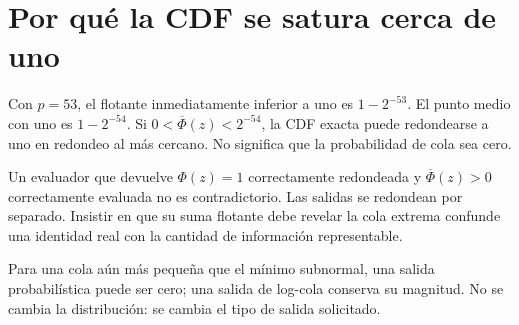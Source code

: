 \documentclass[11pt,a4paper]{article}
\theoremstyle{definition}
\newcommand{\SF}{\overline\Phi}
\begin{document}
\section{Por qué la CDF se satura cerca de uno}
Con $p=53$, el flotante inmediatamente inferior a uno es $1-2^{-53}$.
El punto medio con uno es $1-2^{-54}$.
Si $0<\SF(z)<2^{-54}$, la CDF exacta puede redondearse a uno en redondeo al más cercano.
No significa que la probabilidad de cola sea cero.

Un evaluador que devuelve $\Phi(z)=1$ correctamente redondeada y $\SF(z)>0$ correctamente evaluada no es contradictorio.
Las salidas se redondean por separado.
Insistir en que su suma flotante debe revelar la cola extrema confunde una identidad real con la cantidad de información representable.

Para una cola aún más pequeña que el mínimo subnormal, una salida probabilística puede ser cero; una salida de log-cola conserva su magnitud.
No se cambia la distribución: se cambia el tipo de salida solicitado.
\end{document}
